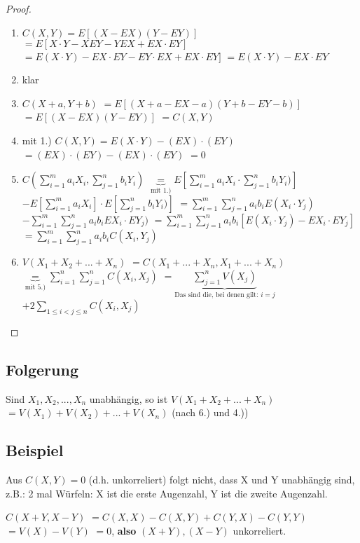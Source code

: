 \begin{proof}
\begin{enumerate}
\item $ C(X,Y) = E[(X-EX)(Y-EY)]$
$=E[X\cdot Y - X EY - YEX + EX\cdot EY]$
$=E(X\cdot Y) - EX\cdot EY - EY\cdot EX + EX\cdot EY] $
$=E(X\cdot Y) - EX \cdot EY$
\item klar
\item $ C(X+a, Y+b)$
$=E[(X+a - EX - a) (Y+b - EY - b)]$
$=E[(X - EX) (Y - EY)]$
$=C(X,Y)$ 
\item mit 1.) $C(X,Y) = E(X\cdot Y) - (EX) \cdot (EY)$ 
$=(EX) \cdot (EY) - (EX) \cdot (EY)$
$=0$
\item $C(\sum_{i=1}^{m} a_i X_i, \sum_{j=1}^{n} b_i Y_i) $
$\underbrace{=}_{\textrm{mit 1.)}} E[\sum_{i=1}^{m} a_i X_i \cdot \sum_{j=1}^{n} b_i Y_i)] $
$- E[\sum_{i=1}^{m} a_i X_i] \cdot E[\sum_{j=1}^{n} b_i Y_i)] $
$= \sum_{i=1}^{m} \sum_{j=1}^{n} a_i b_i E(X_i\cdot Y_j)$
$-\sum_{i=1}^{m} \sum_{j=1}^{n} a_i b_i EX_i \cdot EY_j)$
$=\sum_{i=1}^{m} \sum_{j=1}^{n} a_i b_i [E(X_i\cdot Y_j) - EX_i \cdot EY_j]$
$=\sum_{i=1}^{m} \sum_{j=1}^{n} a_i b_i C(X_i, Y_j)$
\item $V(X_1 + X_2 + ... + X_n)$
$=C(X_1 + ... + X_n, X_1 + ... + X_n)$
$\underbrace{=}_{\textrm{mit 5.)}} \sum_{i=1}^{n} \sum_{j=1}^{n} C(X_i, X_j)$
$=\underbrace{\sum_{j=1}^{n} V(X_j)}_{\textrm{Das sind die, bei denen gilt: } i=j} $
$+ 2 \sum_{1\leq i < j \leq n} C(X_i, X_j)$
\end{enumerate}
\end{proof}

\subsection{Folgerung}
Sind $X_1, X_2, ..., X_n$ unabhängig, so ist 
$ V(X_1 + X_2 + ... + X_n)$
$= V(X_1) + V(X_2) + ... + V(X_n)$ (nach 6.) und 4.))

\subsection{Beispiel} 
Aus $C(X, Y) = 0$ (d.h. unkorreliert) folgt nicht, dass X und Y unabhängig sind, z.B.: 
2 mal Würfeln: X ist die erste Augenzahl, Y ist die zweite Augenzahl. 

$C(X+Y, X-Y)$
$=C(X,X) - C(X,Y) + C(Y,X) - C(Y,Y)$
$=V(X) - V(Y)$
$=0$, \textbf{also} $(X+Y), (X-Y)$ unkorreliert. \\

